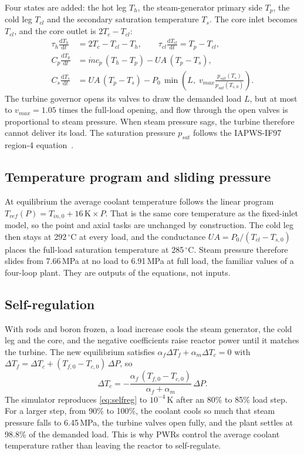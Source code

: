 \documentclass[11pt,a4paper]{article}
\newcommand{\dd}{\mathrm{d}}
\begin{document}
Four states are added: the hot leg $T_h$, the steam-generator primary side $T_p$, the
cold leg $T_{cl}$ and the secondary saturation temperature $T_s$. The core inlet becomes
$T_{cl}$, and the core outlet is $2T_c - T_{cl}$:
\begin{align}
  \tau_h \frac{\dd T_h}{\dd t} &= 2T_c - T_{cl} - T_h,
  \qquad \tau_{cl} \frac{\dd T_{cl}}{\dd t} = T_p - T_{cl}, \\
  C_p \frac{\dd T_p}{\dd t} &= \dot m c_p\,(T_h - T_p) - UA\,(T_p - T_s), \\
  C_s \frac{\dd T_s}{\dd t} &= UA\,(T_p - T_s) - P_0\,\min\!\left(L,\; v_{max}\frac{p_{sat}(T_s)}{p_{sat}(T_{s,0})}\right).
\end{align}
The turbine governor opens its valves to draw the demanded load $L$, but at most to
$v_{max} = 1.05$ times the full-load opening, and flow through the open valves is
proportional to steam pressure. When steam pressure sags, the turbine therefore cannot
deliver its load. The saturation pressure $p_{sat}$ follows the IAPWS-IF97 region-4
equation~\cite{wagner2000}.

\subsection{Temperature program and sliding pressure}

At equilibrium the average coolant temperature follows the linear program
$T_{ref}(P) = T_{in,0} + 16\,\mathrm{K}\times P$. That is the same core temperature as
the fixed-inlet model, so the point and axial tasks are unchanged by construction. The
cold leg then stays at 292\,$^\circ$C at every load, and the conductance
$UA = P_0/(T_{cl} - T_{s,0})$ places the full-load saturation temperature at
285\,$^\circ$C. Steam pressure therefore slides from 7.66\,MPa at no load to
6.91\,MPa at full load, the familiar values of a four-loop plant. They are outputs of
the equations, not inputs.

\subsection{Self-regulation}

With rods and boron frozen, a load increase cools the steam generator, the cold leg
and the core, and the negative coefficients raise reactor power until it matches the
turbine. The new equilibrium satisfies
$\alpha_f \Delta T_f + \alpha_m \Delta T_c = 0$ with
$\Delta T_f = \Delta T_c + (T_{f,0} - T_{c,0})\,\Delta P$, so
\begin{equation}
  \Delta T_c = -\frac{\alpha_f\,(T_{f,0} - T_{c,0})}{\alpha_f + \alpha_m}\,\Delta P .
  \label{eq:selfreg}
\end{equation}
The simulator reproduces \cref{eq:selfreg} to $10^{-4}$\,K after an 80\% to 85\% load
step. For a larger step, from 90\% to 100\%, the coolant cools so much that steam
pressure falls to 6.45\,MPa, the turbine valves open fully, and the plant settles at
98.8\% of the demanded load. This is why PWRs control the average coolant
temperature rather than leaving the reactor to self-regulate.
\end{document}
